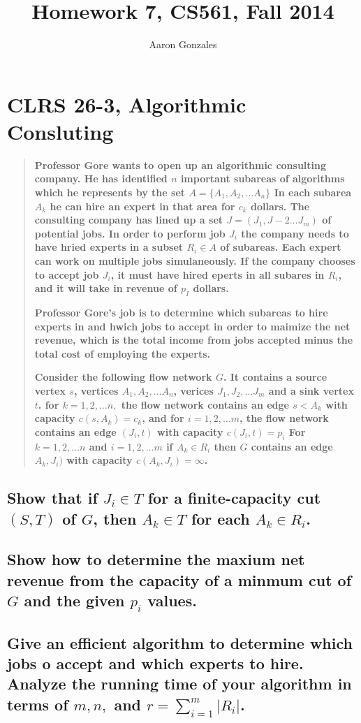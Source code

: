 \documentclass[titlepage]{article}\usepackage[]{graphicx}\usepackage[]{color}
\begin{document}
\title{Homework 7, CS561, Fall 2014}
\author{Aaron Gonzales}
\maketitle


\section{CLRS 26-3, Algorithmic Consluting}
  \begin{quote}
    \textbf{Professor Gore wants to open up an algorithmic consulting company.
    He has identified $n$ important subareas of algorithms which he represents
    by the set $A = \{ A_1, A_2,\dots A_n\}$ In each subarea $A_k$ he can hire
    an expert in that area for $c_k$ dollars. The consulting company has lined
    up a set $J = (J_1, J-2 \dots J_m)$ of potential jobs. In order to perform
    job $J_i$ the company needs to have hried experts in a subset $R_i \in A$
    of subareas. Each expert can work on multiple jobs simulaneously. If the
    company chooses to accept job $J_i$, it must have hired eperts in all
  subares in $R_i$, and it will take in revenue of $p_I$ dollars.} 

    \textbf{Professor Gore's job is to determine which subareas to hire experts in and
    hwich jobs to accept in order to maimize the net revenue, which is the
    total income from jobs accepted minus the total cost of employing the
  experts.}

    \textbf{Consider the following flow network $G$. It contains a source vertex $s$,
    vertices $A_1, A_2,\dots A_n$, verices $J_1, J_2, \dots J_m$ and a sink
    vertex $t$. for $k = 1,2,\dots n,$ the flow network contains an edge
    $s<A_k$ with capacity $c(s,A_k) = c_k$,  and for $i = 1,2, \dots m$, the
    flow network contains an edge $(J_i, t)$ with capacity $c(J_i, t) = p_i$
    For $k = 1,2, \dots n$ and $i = 1,2, \dots m$ if $A_k \in R_i$ then $G$
  contains an edge $A_k, J_i)$ with capacity $c(A_k, J_i) = \infty$. }

  \end{quote}
 \subsection{ Show that if $J_i \in T$ for a finite-capacity cut $(S,T)$ of
 $G$, then $A_k \in T$ for each $A_k \in R_i$.}
 \vspace{8cm}

 \subsection{ Show how to determine the maxium net revenue from the capacity of
 a minmum cut of $G$ and the given $p_i$ values.}
 \vspace{8cm}


 \subsection{ Give an efficient algorithm to determine which jobs o accept and
   which experts to hire. Analyze the running time of your algorithm in terms
   of $m,n,$ and $r = \sum_{i = 1}^m | R_i|$.}
\end{document}
